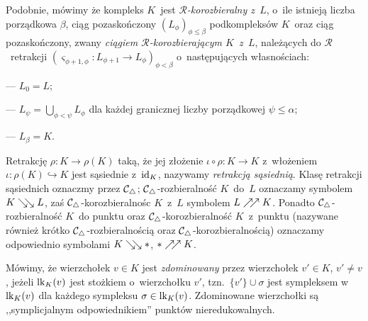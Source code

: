 Podobnie, mówimy że kompleks $K$~jest \textit{$\mathcal{R}$-korozbieralny z~$L$}, o~ile istnieją liczba porządkowa $\beta$, ciąg pozaskończony $\left(L_\phi\right)_{\phi\leq\beta}$ podkompleksów $K$~oraz ciąg pozaskończony, zwany \textit{ciągiem $\mathcal{R}$-korozbierającym $K$~z~$L$}, należących do $\mathcal{R}$~retrakcji $\left(\varsigma_{\phi+1,\phi}\colon L_{\phi+1} \to L_{\phi}\right)_{\phi<\beta}$ o~następujących własnościach:
\begin{compactitem}
\item[---] $L_0=L$;
\item[---] $L_{\psi}=\bigcup_{\phi<\psi}L_{\phi}$ dla każdej granicznej liczby porządkowej $\psi\leq\alpha$;
\item[---] $L_\beta=K$.
\end{compactitem}

Retrakcję $\rho\colon K\to \rho(K)$ taką, że jej złożenie $\iota\circ \rho\colon K\to K$ z~włożeniem \mbox{$\iota\colon \rho(K)\hookrightarrow K$} jest sąsiednie z~$\operatorname{id}_K$, nazywamy \textit{retrakcją sąsiednią}. Klasę retrakcji sąsiednich oznaczmy przez $\mathcal{C}_\triangle$; $\mathcal{C}_\triangle$-rozbieralność $K$~do~$L$ oznaczamy symbolem $K\searrow\!\!\searrow L$, zaś $\mathcal{C}_\triangle$-korozbieralnośc $K$~z~$L$ symbolem $L\nearrow\!\!\nearrow K$. Ponadto $\mathcal{C}_\triangle$-rozbieralność $K$~do punktu oraz $\mathcal{C}_\triangle$-korozbieralność $K$~z~punktu (nazywane również krótko $\mathcal{C}_\triangle$-rozbieralnością oraz $\mathcal{C}_\triangle$-korozbieralnością) oznaczamy odpowiednio symbolami $K\searrow\!\!\searrow *$, $*\nearrow\!\!\nearrow K$.

Mówimy, że wierzchołek $v\in K$ jest \textit{zdominowany} \cite{Barmak12} przez wierzchołek $v'\in K$, $v'\not=v$, jeżeli $\operatorname{lk}_K(v)$ jest stożkiem o~wierzchołku $v'$, tzn.~$\{v'\}\cup \sigma$ jest sympleksem w~$\operatorname{lk}_K(v)$ dla każdego sympleksu $\sigma\in \operatorname{lk}_K(v)$. Zdominowane wierzchołki są ,,symplicjalnym odpowiednikiem'' punktów nieredukowalnych.

